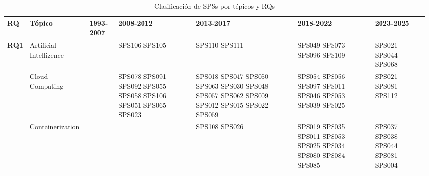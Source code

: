 \begin{table*}[htbp]
	\centering
	\caption{Clasificación de SPSs por tópicos y RQs}
	\label{table:sps_classification_by_topic_rq}
	\renewcommand{\arraystretch}{1.2}
	\setlength{\tabcolsep}{6pt}
	\begin{tabularx}{\textwidth}{p{0.8cm}p{2.5cm}>{\raggedright\arraybackslash}X>{\raggedright\arraybackslash}X>{\raggedright\arraybackslash}X>{\raggedright\arraybackslash}X>{\raggedright\arraybackslash}X}
		\toprule
		\textbf{RQ}                           & \textbf{Tópico}         & \textbf{1993-2007}                                      & \textbf{2008-2012}                                                                                                            & \textbf{2013-2017}                                                                         & \textbf{2018-2022}                                                                  & \textbf{2023-2025}                 \\
		\midrule
		\multirow{12}{*}[-11em]{\textbf{RQ1}} & Artificial Intelligence &                                                         & SPS106 SPS105                                                                                                                 & SPS110 SPS111                                                                              & SPS049 SPS073 SPS096 SPS109                                                         & SPS021 SPS044 SPS068               \\
		\addlinespace[0.3em]
		                                      & Cloud Computing         &                                                         & SPS078 SPS091 SPS092 SPS055 SPS058 SPS106 SPS051 SPS065 SPS023                                                                & SPS018 SPS047 SPS050 SPS063 SPS030 SPS048 SPS057 SPS062 SPS009 SPS012 SPS015 SPS022 SPS059 & SPS054 SPS056 SPS097 SPS011 SPS046 SPS053 SPS039 SPS025                             & SPS021 SPS081 SPS112               \\
		\addlinespace[0.3em]
		                                      & Containerization        &                                                         &                                                                                                                               & SPS108 SPS026                                                                              & SPS019 SPS035 SPS011 SPS053 SPS025 SPS034 SPS080 SPS084 SPS085                      & SPS037 SPS038 SPS044 SPS081 SPS004 \\

\end{tabularx}
\end{table*}
